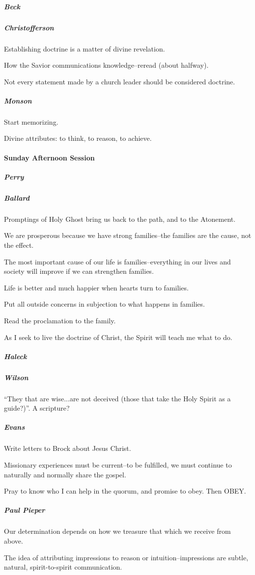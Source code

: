 \subparagraph*{Beck}

\subparagraph*{Christofferson} Establishing doctrine is a matter of divine revelation.

How the Savior communications knowledge--reread (about halfway).

Not every statement made by a church leader should be considered doctrine.

\subparagraph*{Monson} Start memorizing.

Divine attributes: to think, to reason, to achieve.

\paragraph*{Sunday Afternoon Session}

\subparagraph*{Perry}

\subparagraph*{Ballard} Promptings of Holy Ghost bring us back to the path, and to the Atonement.

We are prosperous because we have strong families--the families are the cause, not the effect.

The most important cause of our life is families--everything in our lives and society will improve if we can strengthen families.

Life is better and much happier when hearts turn to families.

Put all outside concerns in subjection to what happens in families.

Read the proclamation to the family.

As I seek to live the doctrine of Christ, the Spirit will teach me what to do.

\subparagraph*{Haleck}

\subparagraph*{Wilson} ``They that are wise...are not deceived (those that take the Holy Spirit as a guide?)''. A scripture?

\subparagraph*{Evans} Write letters to Brock about Jesus Christ.

Missionary experiences must be current--to be fulfilled, we must continue to naturally and normally share the gospel.

Pray to know who I can help in the quorum, and promise to obey. Then OBEY.

\subparagraph*{Paul Pieper} Our determination depends on how we treasure that which we receive from above.

The idea of attributing impressions to reason or intuition--impressions are subtle, natural, spirit-to-spirit communication.

